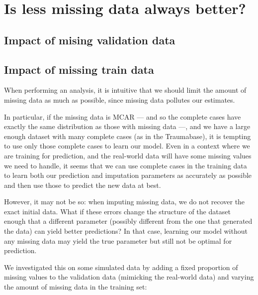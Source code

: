 	\section{Is less missing data always better?}
		\subsection{Impact of mising validation data}
		\subsection{Impact of missing train data}
When performing an analysis, it is intuitive that we should limit the amount of missing data as much as possible, since missing data pollutes our estimates.

In particular, if the missing data is MCAR --- and so the complete cases have exactly the same distribution as those with missing data ---, and we have a large enough dataset with many complete cases (as in the Traumabase), it is tempting to use only those complete cases to learn our model. Even in a context where we are training for prediction, and the real-world data will have some missing values we need to handle, it seems that we can use complete cases in the training data to learn both our prediction and imputation parameters as accurately as possible and then use those to predict the new data at best.

However, it may not be so: when imputing missing data, we do not recover the exact initial data. What if these errors change the structure of the dataset enough that a different parameter (possibly different from the one that generated the data) can yield better predictions? In that case, learning our model without any missing data may yield the true parameter but still not be optimal for prediction.

We investigated this on some simulated data by adding a fixed proportion of missing values to the validation data (mimicking the real-world data) and varying the amount of missing data in the training set:

